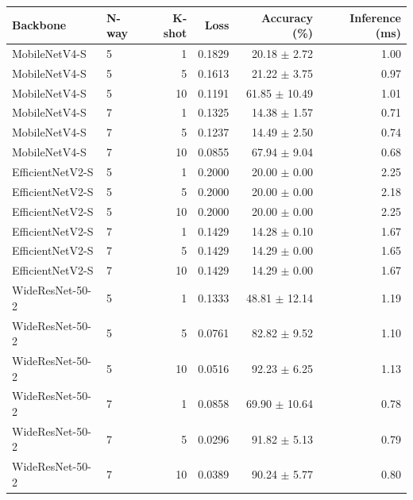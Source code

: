 \begin{tabular}{llrrrr}
Backbone & N-way & K-shot & Loss & Accuracy (\%) & Inference (ms) \\ \hline
MobileNetV4-S & 5 & 1 & 0.1829 & 20.18 $\pm$ 2.72 & 1.00 \\
MobileNetV4-S & 5 & 5 & 0.1613 & 21.22 $\pm$ 3.75 & 0.97 \\
MobileNetV4-S & 5 & 10 & 0.1191 & 61.85 $\pm$ 10.49 & 1.01 \\
MobileNetV4-S & 7 & 1 & 0.1325 & 14.38 $\pm$ 1.57 & 0.71 \\
MobileNetV4-S & 7 & 5 & 0.1237 & 14.49 $\pm$ 2.50 & 0.74 \\
MobileNetV4-S & 7 & 10 & 0.0855 & 67.94 $\pm$ 9.04 & 0.68 \\
EfficientNetV2-S & 5 & 1 & 0.2000 & 20.00 $\pm$ 0.00 & 2.25 \\
EfficientNetV2-S & 5 & 5 & 0.2000 & 20.00 $\pm$ 0.00 & 2.18 \\
EfficientNetV2-S & 5 & 10 & 0.2000 & 20.00 $\pm$ 0.00 & 2.25 \\
EfficientNetV2-S & 7 & 1 & 0.1429 & 14.28 $\pm$ 0.10 & 1.67 \\
EfficientNetV2-S & 7 & 5 & 0.1429 & 14.29 $\pm$ 0.00 & 1.65 \\
EfficientNetV2-S & 7 & 10 & 0.1429 & 14.29 $\pm$ 0.00 & 1.67 \\
WideResNet-50-2 & 5 & 1 & 0.1333 & 48.81 $\pm$ 12.14 & 1.19 \\
WideResNet-50-2 & 5 & 5 & 0.0761 & 82.82 $\pm$ 9.52 & 1.10 \\
WideResNet-50-2 & 5 & 10 & 0.0516 & 92.23 $\pm$ 6.25 & 1.13 \\
WideResNet-50-2 & 7 & 1 & 0.0858 & 69.90 $\pm$ 10.64 & 0.78 \\
WideResNet-50-2 & 7 & 5 & 0.0296 & 91.82 $\pm$ 5.13 & 0.79 \\
WideResNet-50-2 & 7 & 10 & 0.0389 & 90.24 $\pm$ 5.77 & 0.80 \\
\end{tabular}

